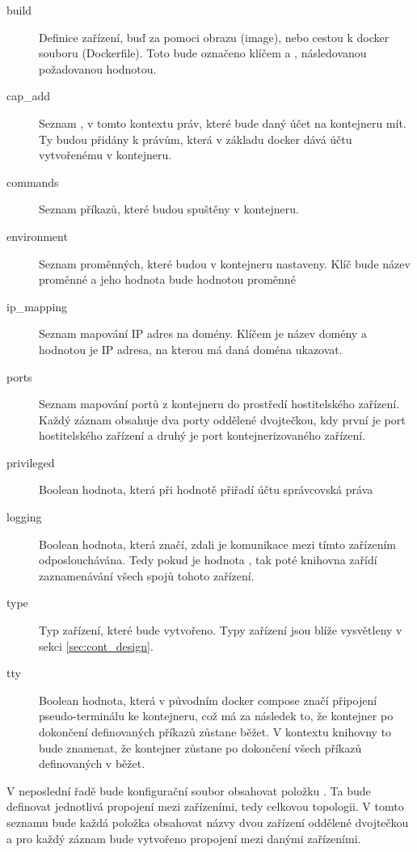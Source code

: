 \begin{description}
    \item[build] Definice zařízení, buď za pomoci obrazu (image), nebo cestou k docker souboru (Dockerfile). Toto bude označeno klíčem  a , následovanou požadovanou hodnotou.
    \item[cap\_add] Seznam , v tomto kontextu práv, které bude daný účet na kontejneru mít. Ty budou přidány k právům, která v základu docker dává účtu vytvořenému v kontejneru. 
    \item[commands] Seznam příkazů, které budou spuštěny v kontejneru.
    \item[environment] Seznam proměnných, které budou v kontejneru nastaveny. Klíč bude název proměnné a jeho hodnota bude hodnotou proměnné
    \item[ip\_mapping] Seznam mapování IP adres na domény. Klíčem je název domény a hodnotou je IP adresa, na kterou má daná doména ukazovat.
    \item[ports] Seznam mapování portů z kontejneru do prostředí hostitelského zařízení. Každý záznam obsahuje dva porty oddělené dvojtečkou, kdy první je port hostitelského zařízení a druhý je port kontejnerizovaného zařízení.
    \item[privileged] Boolean hodnota, která při hodnotě  přiřadí účtu správcovská práva
    \item[logging] Boolean hodnota, která značí, zdali je komunikace mezi tímto zařízením odposlouchávána. Tedy pokud je hodnota , tak poté knihovna zařídí zaznamenávání všech spojů tohoto zařízení.
    \item[type] Typ zařízení, které bude vytvořeno. Typy zařízení jsou blíže vysvětleny v sekci \ref{sec:cont_design}.
    \item[tty] Boolean hodnota, která v původním docker compose značí připojení pseudo-terminálu ke kontejneru, což má za následek to, že kontejner po dokončení definovaných příkazů zůstane běžet. V kontextu knihovny to bude znamenat, že kontejner zůstane po dokončení všech příkazů definovaných v  běžet. 
\end{description}

V neposlední řadě bude konfigurační soubor obsahovat položku . Ta bude definovat jednotlivá propojení mezi zařízeními, tedy celkovou topologii. V tomto seznamu bude každá položka obsahovat názvy dvou zařízení oddělené dvojtečkou a pro každý záznam bude vytvořeno propojení mezi danými zařízeními.

